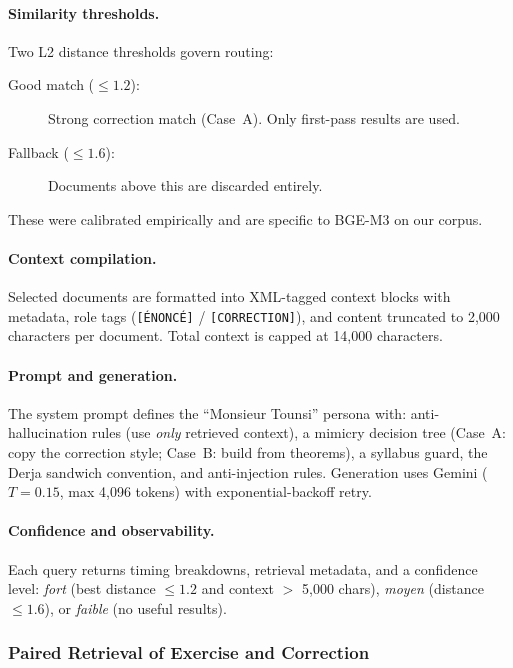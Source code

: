 \paragraph{Similarity thresholds.}
Two L2 distance thresholds govern routing:
\begin{description}
    \item[Good match ($\leq 1.2$):] Strong correction match (Case~A). Only
    first-pass results are used.
    \item[Fallback ($\leq 1.6$):] Documents above this are discarded
    entirely.
\end{description}
These were calibrated empirically and are specific to BGE-M3 on our corpus.

\paragraph{Context compilation.}
Selected documents are formatted into XML-tagged context blocks with
metadata, role tags (\texttt{[\'ENONC\'E]} / \texttt{[CORRECTION]}), and
content truncated to 2{,}000 characters per document. Total context is
capped at 14{,}000 characters.

\paragraph{Prompt and generation.}
The system prompt defines the ``Monsieur Tounsi'' persona with:
anti-hallucination rules (use \textit{only} retrieved context), a mimicry
decision tree (Case~A: copy the correction style; Case~B: build from
theorems), a syllabus guard, the Derja sandwich convention, and
anti-injection rules. Generation uses Gemini ($T = 0.15$, max 4{,}096
tokens) with exponential-backoff retry.

\paragraph{Confidence and observability.}
Each query returns timing breakdowns, retrieval metadata, and a confidence
level: \textit{fort} (best distance $\leq 1.2$ and context $>$ 5{,}000
chars), \textit{moyen} (distance $\leq 1.6$), or \textit{faible} (no
useful results).


\subsubsection{Paired Retrieval of Exercise and Correction}
\label{subsec:paired-retrieval}


